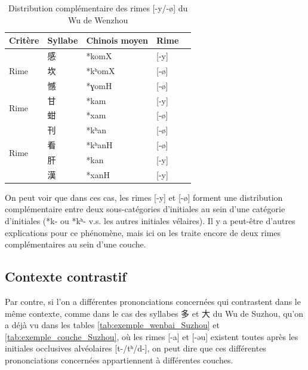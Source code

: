 \documentclass{scrbook}
\newcounter{c}[subsubsection]
\begin{document}
\begin{sloppypar}
\begin{table}[htbp]
  \centering
    \begin{tabular}{llllr}
    \toprule
    Critère & Syllabe & Chinois moyen  & Rime\\
    \midrule
    \multirow{3}[2]{*}{Rime} & 感     & *komX & [-y] \\
          & 坎     & *kʰomX & [-ø] \\
          & 憾     & *ɣomH & [-ø] \\
    \midrule
    \multirow{2}[2]{*}{Rime} & 甘     & *kam  & [-y] \\
          & 蚶     & *xam  & [-ø] \\
    \midrule
    \multirow{4}[2]{*}{Rime} & 刊     & *kʰan & [-ø] \\
          & 看     & *kʰanH & [-ø] \\
          & 肝     & *kan  & [-y] \\
          & 漢     & *xanH & [-y] \\
    \bottomrule
    \end{tabular}%
  \caption{Distribution complémentaire des rimes [-y/-ø] du Wu de Wenzhou}
  \label{tab:exemple_dstr_compl_rime_wenzhou}%
\end{table}%

On peut voir que dans ces cas, les rimes [-y] et [-ø] forment une distribution complémentaire entre deux sous-catégories d'initiales au sein d'une catégorie d'initiales (*k- ou *kʰ- v.s. les autres initiales vélaires). Il y a peut-être d'autres explications pour ce phénomène, mais ici on les traite encore de deux rimes complémentaires au sein d'une couche.

\subsection{Contexte contrastif}
Par contre, si l'on a différentes prononciations concernées qui contrastent dans le même contexte, comme dans le cas des syllabes 多 et 大 du Wu de Suzhou, qu'on a déjà vu dans les tables \ref{tab:exemple_wenbai_Suzhou} et \ref{tab:exemple_couche_Suzhou}, où les rimes [-a] et [-əu] existent toutes après les initiales occlusives alvéolaires [t-/tʰ/d-], on peut dire que ces différentes prononciations concernées appartiennent à différentes couches. %


\end{sloppypar}
\end{document}
